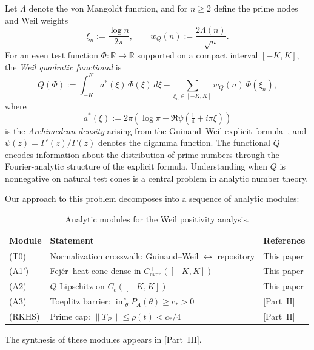 \documentclass[11pt,a4paper]{article}
\theoremstyle{definition}
\theoremstyle{remark}
\newcommand{\R}{\mathbb{R}}
\begin{document}
Let $\Lambda$ denote the von Mangoldt function, and for $n \geq 2$ define the prime nodes and Weil weights
\begin{equation}\label{eq:nodes-weights}
  \xi_n := \frac{\log n}{2\pi}, \qquad w_Q(n) := \frac{2\Lambda(n)}{\sqrt{n}}.
\end{equation}
For an even test function $\Phi : \R \to \R$ supported on a compact interval $[-K, K]$, the \emph{Weil quadratic functional} is
\begin{equation}\label{eq:Q-def}
  Q(\Phi) := \int_{-K}^{K} a^*(\xi)\, \Phi(\xi)\, d\xi - \sum_{\xi_n \in [-K,K]} w_Q(n)\, \Phi(\xi_n),
\end{equation}
where
\begin{equation}\label{eq:a-star}
  a^*(\xi) := 2\pi \left( \log \pi - \Re \psi\left(\tfrac{1}{4} + i\pi\xi\right) \right)
\end{equation}
is the \emph{Archimedean density} arising from the Guinand--Weil explicit formula~\cite{Weil1952,Guinand1948}, and $\psi(z) = \Gamma'(z)/\Gamma(z)$ denotes the digamma function. The functional $Q$ encodes information about the distribution of prime numbers through the Fourier-analytic structure of the explicit formula. Understanding when $Q$ is nonnegative on natural test cones is a central problem in analytic number theory.

Our approach to this problem decomposes into a sequence of analytic modules:

\begin{table}[h]
\centering
\caption{Analytic modules for the Weil positivity analysis.}
\label{tab:modules}
\begin{tabular}{@{}lll@{}}
\toprule
Module & Statement & Reference \\
\midrule
(T0)  & Normalization crosswalk: Guinand--Weil $\leftrightarrow$ repository & This paper \\
(A1') & Fej\'er--heat cone dense in $C^+_{\mathrm{even}}([-K,K])$ & This paper \\
(A2)  & $Q$ Lipschitz on $C_c([-K,K])$ & This paper \\
(A3)  & Toeplitz barrier: $\inf_\theta P_A(\theta) \geq c_* > 0$ & [Part~II] \\
(RKHS) & Prime cap: $\|T_P\| \leq \rho(t) < c_*/4$ & [Part~II] \\
\bottomrule
\end{tabular}
\end{table}

\noindent The synthesis of these modules appears in [Part~III].
\end{document}
